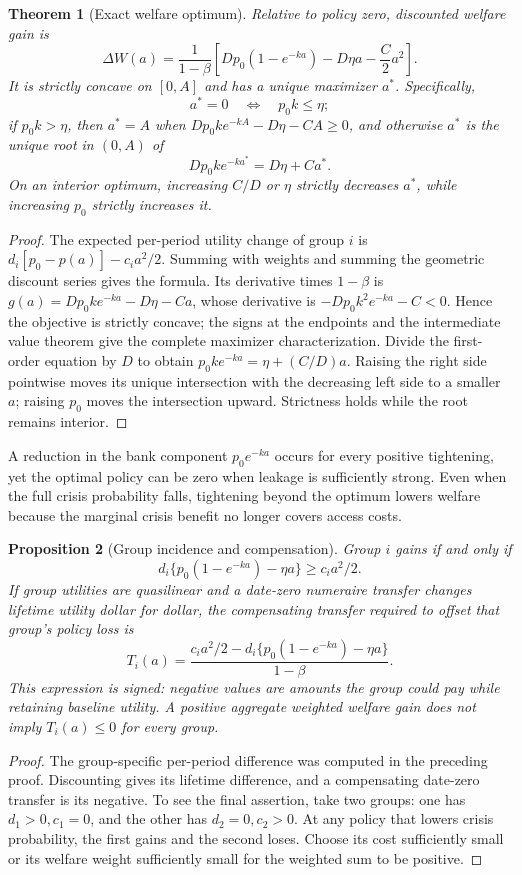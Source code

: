 \documentclass[11pt]{article}
\newtheorem{theorem}{Theorem}
\newtheorem{proposition}[theorem]{Proposition}
\theoremstyle{remark}\newtheorem{remark}[theorem]{Remark}
\begin{document}
\begin{theorem}[Exact welfare optimum]
Relative to policy zero, discounted welfare gain is
\[
 \Delta W(a)=\frac{1}{1-\beta}
 \left[D p_0(1-e^{-ka})-D\eta a-\frac C2a^2\right].
\]
It is strictly concave on $[0,A]$ and has a unique maximizer $a^*$. Specifically,
\[
 a^*=0\quad\Longleftrightarrow\quad p_0k\le\eta;
\]
if $p_0k>\eta$, then $a^*=A$ when
$Dp_0ke^{-kA}-D\eta-CA\ge0$, and otherwise $a^*$ is the unique root in $(0,A)$ of
\[
 Dp_0ke^{-ka^*}=D\eta+Ca^*.
\]
On an interior optimum, increasing $C/D$ or $\eta$ strictly decreases $a^*$, while increasing $p_0$ strictly increases it.
\end{theorem}
\begin{proof}
The expected per-period utility change of group $i$ is
$d_i[p_0-p(a)]-c_i a^2/2$. Summing with weights and summing the geometric discount series gives the formula. Its derivative times $1-\beta$ is
$g(a)=Dp_0ke^{-ka}-D\eta-Ca$, whose derivative is
$-Dp_0k^2e^{-ka}-C<0$. Hence the objective is strictly concave; the signs at the endpoints and the intermediate value theorem give the complete maximizer characterization. Divide the first-order equation by $D$ to obtain $p_0ke^{-ka}=\eta+(C/D)a$. Raising the right side pointwise moves its unique intersection with the decreasing left side to a smaller $a$; raising $p_0$ moves the intersection upward. Strictness holds while the root remains interior.
\end{proof}

A reduction in the bank component $p_0e^{-ka}$ occurs for every positive tightening, yet the optimal policy can be zero when leakage is sufficiently strong. Even when the full crisis probability falls, tightening beyond the optimum lowers welfare because the marginal crisis benefit no longer covers access costs.

\begin{proposition}[Group incidence and compensation]
Group $i$ gains if and only if
\[
 d_i\{p_0(1-e^{-ka})-\eta a\}\ge c_i a^2/2.
\]
If group utilities are quasilinear and a date-zero numeraire transfer changes lifetime utility dollar for dollar, the compensating transfer required to offset that group's policy loss is
\[
 T_i(a)=\frac{c_i a^2/2-d_i\{p_0(1-e^{-ka})-\eta a\}}{1-\beta}.
\]
This expression is signed: negative values are amounts the group could pay while retaining baseline utility. A positive aggregate weighted welfare gain does not imply $T_i(a)\le0$ for every group.
\end{proposition}
\begin{proof}
The group-specific per-period difference was computed in the preceding proof. Discounting gives its lifetime difference, and a compensating date-zero transfer is its negative. To see the final assertion, take two groups: one has $d_1>0,c_1=0$, and the other has $d_2=0,c_2>0$. At any policy that lowers crisis probability, the first gains and the second loses. Choose its cost sufficiently small or its welfare weight sufficiently small for the weighted sum to be positive.
\end{proof}
\end{document}
